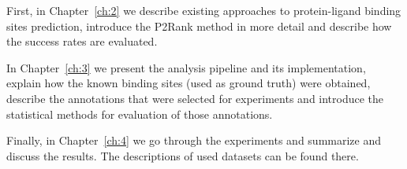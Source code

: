 First, in Chapter~\ref{ch:2} we describe existing approaches to protein-ligand binding sites prediction, introduce the P2Rank method in more detail and describe how the success rates are evaluated.

In Chapter~\ref{ch:3} we present the analysis pipeline and its implementation, explain how the known binding sites (used as ground truth) were obtained, describe the annotations that were selected for experiments and introduce the statistical methods for evaluation of those annotations. 

Finally, in Chapter~\ref{ch:4} we go through the experiments and summarize and discuss the results. The descriptions of used datasets can be found there.
